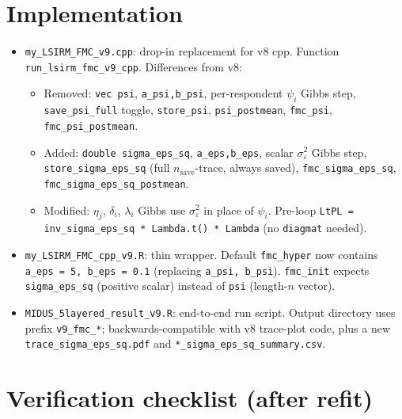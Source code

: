 \documentclass[11pt]{article}
\begin{document}
\section{Implementation}

\begin{itemize}[leftmargin=1.5em]
    \item \texttt{my\_LSIRM\_FMC\_v9.cpp}: drop-in replacement for v8 cpp.
        Function \texttt{run\_lsirm\_fmc\_v9\_cpp}. Differences from v8:
        \begin{itemize}[leftmargin=1em]
            \item Removed: \texttt{vec psi}, \texttt{a\_psi,b\_psi},
                  per-respondent $\psi_i$ Gibbs step, \texttt{save\_psi\_full} toggle,
                  \texttt{store\_psi}, \texttt{psi\_postmean}, \texttt{fmc\_psi}, \texttt{fmc\_psi\_postmean}.
            \item Added: \texttt{double sigma\_eps\_sq}, \texttt{a\_eps,b\_eps},
                  scalar $\sigma_\varepsilon^2$ Gibbs step,
                  \texttt{store\_sigma\_eps\_sq} (full $n_{\mathrm{save}}$-trace, always saved),
                  \texttt{fmc\_sigma\_eps\_sq}, \texttt{fmc\_sigma\_eps\_sq\_postmean}.
            \item Modified: $\eta_j$, $\delta_i$, $\lambda_i$ Gibbs use
                  $\sigma_\varepsilon^2$ in place of $\psi_i$.
                  Pre-loop \texttt{LtPL = inv\_sigma\_eps\_sq * Lambda.t() * Lambda}
                  (no \texttt{diagmat} needed).
        \end{itemize}
    \item \texttt{my\_LSIRM\_FMC\_cpp\_v9.R}: thin wrapper.
        Default \texttt{fmc\_hyper} now contains
        \texttt{a\_eps = 5, b\_eps = 0.1} (replacing \texttt{a\_psi, b\_psi}).
        \texttt{fmc\_init} expects \texttt{sigma\_eps\_sq} (positive scalar)
        instead of \texttt{psi} (length-$n$ vector).
    \item \texttt{MIDUS\_5layered\_result\_v9.R}: end-to-end run script.
        Output directory uses prefix \texttt{v9\_fmc\_*}; backwards-compatible
        with v8 trace-plot code, plus a new \texttt{trace\_sigma\_eps\_sq.pdf}
        and \texttt{*\_sigma\_eps\_sq\_summary.csv}.
\end{itemize}

\section{Verification checklist (after refit)}
\end{document}

